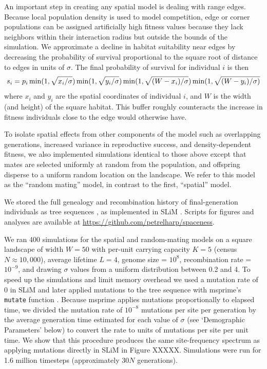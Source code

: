 \documentclass[10pt,twoside,lineno,hidelinks]{preprint}
\begin{document}
An important step in creating any spatial model is dealing with range edges. 
Because local population density is used to model competition, edge or corner populations can be assigned artificially high fitness values 
because they lack neighbors within their interaction radius but outside the bounds of the simulation.
We approximate a decline in habitat suitability near edges by decreasing the probability of survival proportional to the square root of distance to edges in units of $\sigma$. 
The final probability of survival for individual $i$ is then
\begin{equation}
    s_{i} = p_{i} 
        \min(1,\sqrt{x_{i}/\sigma})
        \min(1,\sqrt{y_{i}/\sigma})\\
        \min(1,\sqrt{(W - x_{i})/\sigma})
        \min(1,\sqrt{(W - y_{i})/\sigma)}
\end{equation}
where $x_i$ and $y_i$ are the spatial coordinates of individual $i$, and $W$ is the width (and height) of the square habitat.
This buffer roughly counteracts the increase in fitness individuals close to the edge would otherwise have.

To isolate spatial effects from other components of the model such as overlapping generations, increased variance in reproductive success, and density-dependent fitness, 
we also implemented simulations identical to those above except that mates are selected uniformly at random from the population,
and offspring disperse to a uniform random location on the landscape. 
We refer to this model as the ``random mating'' model, in contrast to the first, ``spatial'' model. 

We stored the full genealogy and recombination history of final-generation individuals as tree sequences \citep{Kelleher2018},
as implemented in SLiM \citep{haller2019treesequence}. 
Scripts for figures and analyses are available at \url{https://github.com/petrelharp/spaceness}.  

We ran 400 simulations for the spatial and random-mating models on a square landscape of width $W=50$  
with per-unit carrying capacity $K=5$ (census $N \approx 10,000$), 
average lifetime $L=4$, 
genome size = $10^{8}$, 
recombination rate = $10^{-9}$, 
and drawing $\sigma$ values from a uniform distribution between 0.2 and 4. 
To speed up the simulations and limit memory overhead we used a mutation rate of 0 in SLiM 
and later applied mutations to the tree sequence with msprime's \texttt{mutate} function \citep{Kelleher2016}. 
Because msprime applies mutations proportionally to elapsed time,
we divided the mutation rate of $10^{-8}$ mutations per site per generation
by the average generation time estimated for each value of $\sigma$ (see `Demographic Parameters' below) to convert the rate to units of mutations per site per unit time.
We show that this procedure produces the same site-frequency spectrum as applying mutations directly in SLiM in Figure XXXXX. Simulations were run for 1.6 million timesteps (approximately $30N$ generations).
\end{document}
